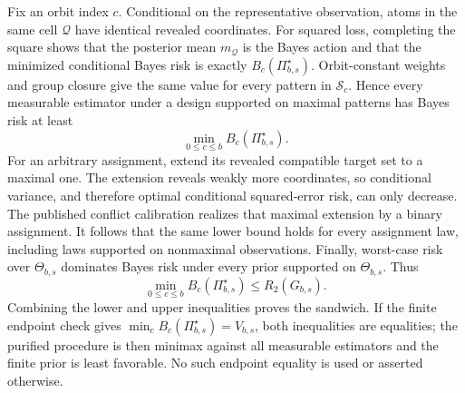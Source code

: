 Fix an orbit index \(c\).  Conditional on the representative observation, atoms in the same cell \(\mathcal Q\) have identical revealed coordinates.  For squared loss, completing the square shows that the posterior mean \(m_{\mathcal Q}\) is the Bayes action and that the minimized conditional Bayes risk is exactly \(B_c(\Pi_{b,s}^{\star})\).  Orbit-constant weights and group closure give the same value for every pattern in \(\mathcal S_c\).  Hence every measurable estimator under a design supported on maximal patterns has Bayes risk at least
\[
\min_{0\le c\le b}B_c(\Pi_{b,s}^{\star}).
\]
For an arbitrary assignment, extend its revealed compatible target set to a maximal one.  The extension reveals weakly more coordinates, so conditional variance, and therefore optimal conditional squared-error risk, can only decrease.  The published conflict calibration realizes that maximal extension by a binary assignment.  It follows that the same lower bound holds for every assignment law, including laws supported on nonmaximal observations.  Finally, worst-case risk over \(\Theta_{b,s}\) dominates Bayes risk under every prior supported on \(\Theta_{b,s}\).  Thus
\[
\min_{0\le c\le b}B_c(\Pi_{b,s}^{\star})
\le R_2(G_{b,s}).
\]
Combining the lower and upper inequalities proves the sandwich.  If the finite endpoint check gives \(\min_cB_c(\Pi_{b,s}^{\star})=V_{b,s}\), both inequalities are equalities; the purified procedure is then minimax against all measurable estimators and the finite prior is least favorable.  No such endpoint equality is used or asserted otherwise.